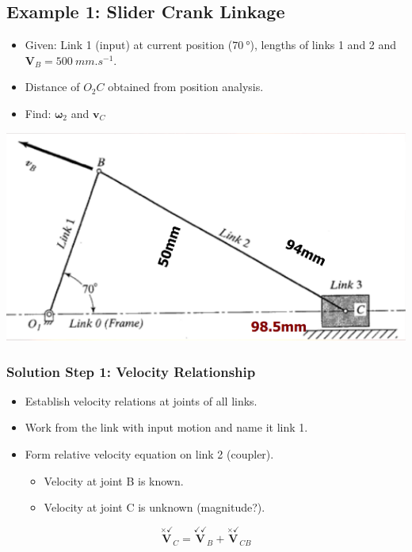 \documentclass[11pt]{article}
\begin{document}
 \newpage
\subsection{Example 1: Slider Crank Linkage}
\label{sec:org7612fed}
\begin{itemize}
\item Given: Link 1 (input) at current position (\(\qty{70}{\degree}\)), lengths of links 1 and 2 and \(\boldsymbol{V}_B = \qty{500}{mm.s^{-1}}\).
\item Distance of \(O_2 C\) obtained from position analysis.
\item Find: \(\boldsymbol{\omega}_2\) and \(\boldsymbol{v}_C\)
\end{itemize}

\begin{center}
\includegraphics[width=.9\linewidth]{./images/slider-crank-linkage-graphical-analysis-example.png}
\end{center}
\subsubsection{Solution Step 1: Velocity Relationship}
\label{sec:org48deda6}
\begin{itemize}
\item Establish velocity relations at joints of all links.
\item Work from the link with input motion and name it link 1.
\item Form relative velocity equation on link 2 (coupler).
\begin{itemize}
\item Velocity at joint B is known.
\item Velocity at joint C is unknown (magnitude?).
\end{itemize}
\end{itemize}
\[\overset{\times \checkmark}{\boldsymbol{V}}_C = \overset{\checkmark \checkmark}{\boldsymbol{V}}_B + \overset{\times \checkmark}{\boldsymbol{V}}_{CB}\]
\end{document}

